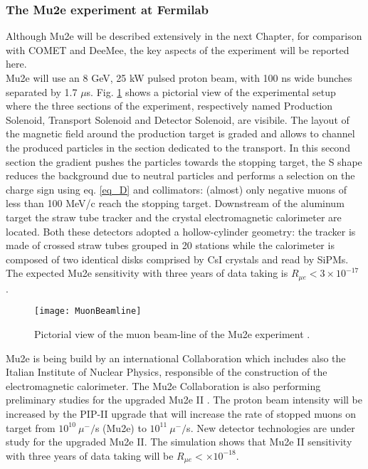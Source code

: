\documentclass[12pt,a4paper,openright, oneside, titlepage]{book} %
\begin{document}
\subsubsection{The Mu2e experiment at Fermilab}
Although Mu2e will be described extensively in the next Chapter, for comparison with COMET and DeeMee,
the key aspects of the experiment will be reported here.\\
Mu2e will use an 8 GeV, 25 kW pulsed proton beam, with 100 ns wide bunches separated by 1.7 $\mu$s.  
Fig. \ref{_MuonBeamline} shows a pictorial view of the experimental setup 
where the three sections of the experiment, respectively named
Production Solenoid, Transport Solenoid and Detector Solenoid, are visibile.  
The layout of the magnetic field around the production target is graded and allows to channel the produced particles in the section dedicated to the transport. 
In this second section the gradient pushes the particles towards the stopping target, the S shape reduces the background 
due to neutral particles and performs a selection on the charge sign using eq. \ref{eq_D} and collimators: (almost) only negative muons of less than 100 MeV/c reach the stopping target. Downstream of the aluminum target the straw tube tracker and the crystal electromagnetic calorimeter are located. Both these detectors adopted a hollow-cylinder geometry: 
the tracker is made of crossed straw tubes grouped in 20 stations 
while the calorimeter is composed of two identical disks comprised by CsI crystals and read by SiPMs.
The expected Mu2e sensitivity with three years of data taking is $R_{\mu e}<3\times10^{-17}$ \cite{MTDR}.



\begin{figure}[h!]
\centering
\texttt{[image: MuonBeamline]}
\caption{Pictorial view of the muon beam-line of the Mu2e experiment \cite{MTDR}.}
\label{_MuonBeamline}
\end{figure}

\noindent
Mu2e is being build by an international Collaboration which includes also the Italian Institute of Nuclear Physics,
responsible of the construction of the electromagnetic calorimeter.
The Mu2e Collaboration is also performing preliminary studies for the upgraded Mu2e II
\cite{Mu2e_II:2018}. 
The proton beam intensity will be increased by the PIP-II upgrade \cite{PIP_II:2018} 
that will increase the rate of stopped muons on target from $10^{10}\ \mu^-/$s (Mu2e) 
to $10^{11}\ \mu^-/$s. New detector technologies are under study for the upgraded Mu2e II.
The simulation shows that Mu2e II
sensitivity with three years of data taking will be $R_{\mu e} < \times10^{-18}$.
\end{document}
